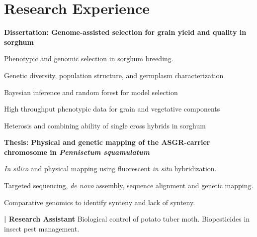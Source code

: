\documentclass[]{deedy-resume-openfont}
\begin{document}
\begin{minipage}[t]{0.68\textwidth} 


\section{Research Experience}
\sectionsep
\textbf{Dissertation: Genome-assisted selection for grain yield and quality in sorghum}
\vspace{\topsep}
\begin{tightemize}
\item Phenotypic and genomic selection in sorghum breeding.
\item Genetic diversity, population structure, and germplasm characterization
\item Bayesian inference  and random forest for model selection
\item High throughput phenotypic data for grain and vegetative components
\item Heterosis and combining ability of single cross hybrids in sorghum
\end{tightemize}
\sectionsep
{}
\sectionsep
\textbf{Thesis: Physical and genetic mapping of the ASGR-carrier chromosome in \textit{Pennisetum squamulatum}}
\vspace{\topsep} %
\begin{tightemize}
\item \textit{In silico} and physical mapping using fluorescent \textit{in situ} hybridization.
\item Targeted sequencing, \textit{de novo} assembly, sequence alignment and genetic mapping.
\item Comparative genomics to identify synteny and lack of synteny.
\end{tightemize}
\sectionsep
{}
\textbf{ | Research Assistant}
Biological control of potato tuber moth. Biopesticides in insect pest management.
\sectionsep


\end{minipage}
\end{document}
